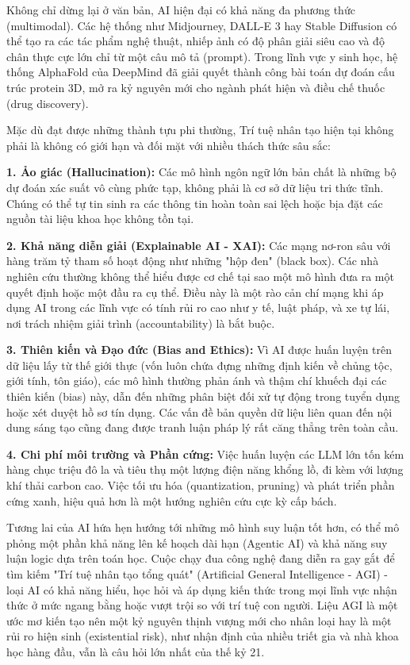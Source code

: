 Không chỉ dừng lại ở văn bản, AI hiện đại có khả năng đa phương thức (multimodal). Các hệ thống như Midjourney, DALL-E 3 hay Stable Diffusion có thể tạo ra các tác phẩm nghệ thuật, nhiếp ảnh có độ phân giải siêu cao và độ chân thực cực lớn chỉ từ một câu mô tả (prompt). Trong lĩnh vực y sinh học, hệ thống AlphaFold của DeepMind đã giải quyết thành công bài toán dự đoán cấu trúc protein 3D, mở ra kỷ nguyên mới cho ngành phát hiện và điều chế thuốc (drug discovery).

Mặc dù đạt được những thành tựu phi thường, Trí tuệ nhân tạo hiện tại không phải là không có giới hạn và đối mặt với nhiều thách thức sâu sắc:

\textbf{1. Ảo giác (Hallucination):} Các mô hình ngôn ngữ lớn bản chất là những bộ dự đoán xác suất vô cùng phức tạp, không phải là cơ sở dữ liệu tri thức tĩnh. Chúng có thể tự tin sinh ra các thông tin hoàn toàn sai lệch hoặc bịa đặt các nguồn tài liệu khoa học không tồn tại.

\textbf{2. Khả năng diễn giải (Explainable AI - XAI):} Các mạng nơ-ron sâu với hàng trăm tỷ tham số hoạt động như những "hộp đen" (black box). Các nhà nghiên cứu thường không thể hiểu được cơ chế tại sao một mô hình đưa ra một quyết định hoặc một đầu ra cụ thể. Điều này là một rào cản chí mạng khi áp dụng AI trong các lĩnh vực có tính rủi ro cao như y tế, luật pháp, và xe tự lái, nơi trách nhiệm giải trình (accountability) là bắt buộc.

\textbf{3. Thiên kiến và Đạo đức (Bias and Ethics):} Vì AI được huấn luyện trên dữ liệu lấy từ thế giới thực (vốn luôn chứa đựng những định kiến về chủng tộc, giới tính, tôn giáo), các mô hình thường phản ánh và thậm chí khuếch đại các thiên kiến (bias) này, dẫn đến những phân biệt đối xử tự động trong tuyển dụng hoặc xét duyệt hồ sơ tín dụng. Các vấn đề bản quyền dữ liệu liên quan đến nội dung sáng tạo cũng đang được tranh luận pháp lý rất căng thẳng trên toàn cầu.

\textbf{4. Chi phí môi trường và Phần cứng:} Việc huấn luyện các LLM lớn tốn kém hàng chục triệu đô la và tiêu thụ một lượng điện năng khổng lồ, đi kèm với lượng khí thải carbon cao. Việc tối ưu hóa (quantization, pruning) và phát triển phần cứng xanh, hiệu quả hơn là một hướng nghiên cứu cực kỳ cấp bách.

Tương lai của AI hứa hẹn hướng tới những mô hình suy luận tốt hơn, có thể mô phỏng một phần khả năng lên kế hoạch dài hạn (Agentic AI) và khả năng suy luận logic dựa trên toán học. Cuộc chạy đua công nghệ đang diễn ra gay gắt để tìm kiếm "Trí tuệ nhân tạo tổng quát" (Artificial General Intelligence - AGI) - loại AI có khả năng hiểu, học hỏi và áp dụng kiến thức trong mọi lĩnh vực nhận thức ở mức ngang bằng hoặc vượt trội so với trí tuệ con người. Liệu AGI là một ước mơ kiến tạo nên một kỷ nguyên thịnh vượng mới cho nhân loại hay là một rủi ro hiện sinh (existential risk), như nhận định của nhiều triết gia và nhà khoa học hàng đầu, vẫn là câu hỏi lớn nhất của thế kỷ 21.

